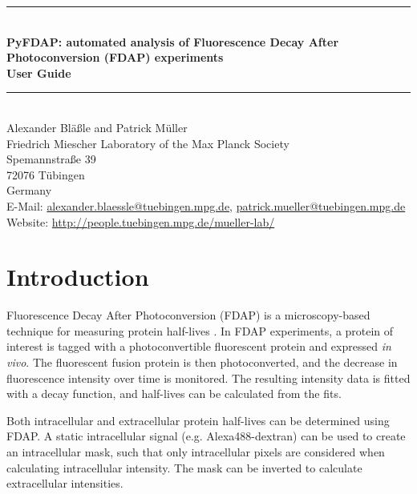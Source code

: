 \documentclass[a4paper,11pt]{article}
\newcommand{\HRule}{\rule{\linewidth}{0.5mm}}
\begin{document}
\begin{titlepage}
\begin{center}

\HRule \\[0.4cm]
{ \huge \bfseries PyFDAP: automated analysis of Fluorescence Decay After Photoconversion (FDAP) experiments\\[0.4cm] 
User Guide \\[0.4cm] }

\HRule \\[1.5cm]

\large
Alexander Bl\"a\ss le and Patrick M\"uller\\[0.5cm]

Friedrich Miescher Laboratory of the Max Planck Society\\
Spemannstra\ss e 39\\
72076 T\"ubingen\\
Germany\\[0.5cm]

E-Mail: \href{mailto:alexander.blaessle@tuebingen.mpg.de}{alexander.blaessle@tuebingen.mpg.de}, \href{mailto:patrick.mueller@tuebingen.mpg.de}{patrick.mueller@tuebingen.mpg.de}\\
Website: \href{http://people.tuebingen.mpg.de/mueller-lab/}{http://people.tuebingen.mpg.de/mueller-lab/}

\vfill

\end{center}
\end{titlepage}

\tableofcontents
\newpage
\section{Introduction}
Fluorescence Decay After Photoconversion (FDAP) is a microscopy-based technique for measuring protein half-lives \citep{Rogers2014}. In FDAP experiments, a protein of interest is tagged with a photoconvertible fluorescent protein and expressed \textit{in vivo}. The fluorescent fusion protein is then photoconverted, and the decrease in fluorescence intensity over time is monitored. The resulting intensity data is fitted with a decay function, and half-lives can be calculated from the fits.

Both intracellular and extracellular protein half-lives can be determined using FDAP. A static intracellular signal (e.g. Alexa488-dextran) can be used to create an intracellular mask, such that only intracellular pixels are considered when calculating intracellular intensity. The mask can be inverted to calculate extracellular intensities. 
\end{document}
